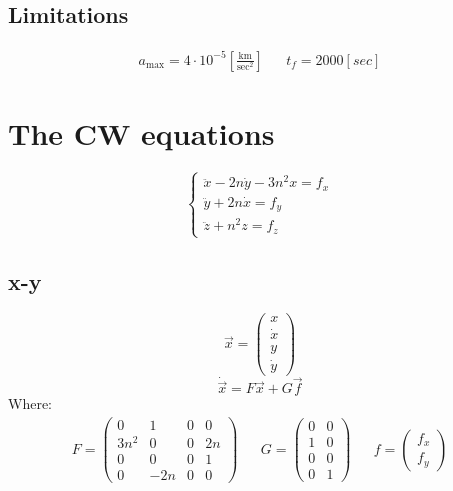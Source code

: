 \documentclass[11pt, a4paper]{article}
\begin{document}
\subsection{Limitations}
\begin{equation*}
    \begin{matrix}
        a_\text{max} = 4\cdot10^{-5}\left[\frac{\mathrm{km}}{\mathrm{sec}^2}\right] && t_f=2000\left[sec\right]
    \end{matrix}
\end{equation*}

\section{The CW equations}
\begin{equation}
    \left\{\begin{array}{l}
        \ddot{x}-2n\dot{y}-3n^2x=f_x\\
        \ddot{y}+2n\dot{x}=f_y\\
        \ddot{z}+n^2z=f_z
    \end{array}\right.
\end{equation}

\subsection{x-y}
\begin{equation}
    \vec{x}=\begin{pmatrix}
        x\\\dot{x}\\y\\\dot{y}
    \end{pmatrix}
\end{equation}
\begin{equation}
    \dot{\vec{x}}=F\vec{x}+G\vec{f}
\end{equation}
Where:
\begin{equation}
    \begin{matrix}
        F=\begin{pmatrix}
            0 & 1 & 0 & 0 \\
            3n^2 & 0 & 0 & 2n \\
            0 & 0 & 0 & 1 \\
            0 & -2n & 0 & 0
        \end{pmatrix} && G=\begin{pmatrix}
            0 & 0\\
            1 & 0\\
            0 & 0\\
            0 & 1
        \end{pmatrix} && f=\begin{pmatrix}
            f_x\\f_y
        \end{pmatrix}
    \end{matrix}
\end{equation}
\end{document}
